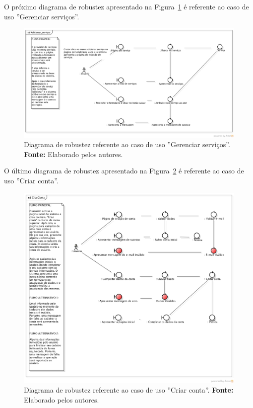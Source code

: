 O próximo diagrama de robustez apresentado na Figura~\ref{fig:ap1:diagrama_robustez_gerenciar_servicos} é referente ao caso de uso ''Gerenciar serviços''.

\captionsetup[figure]{list=no}
\begin{figure}[h!]
	\centerline{\includegraphics[scale=0.4]{./imagens/apendices/diagrama-robustez-adicionar-servicos.png}}
	\caption[Diagrama de robustez referente ao caso de uso ''Gerenciar serviços''.]
	{Diagrama de robustez referente ao caso de uso ''Gerenciar serviços''. \textbf{Fonte:} Elaborado pelos autores.}
	\label{fig:ap1:diagrama_robustez_gerenciar_servicos}
\end{figure}

O último diagrama de robustez apresentado na Figura~\ref{fig:ap1:diagrama_robustez_criar_conta} é referente ao caso de uso ''Criar conta''.

\newpage
\captionsetup[figure]{list=no}
\begin{figure}[h!]
	\centerline{\includegraphics[scale=0.4]{./imagens/apendices/diagrama-robustez-criar-conta.png}}
	\caption[Diagrama de robustez referente ao caso de uso ''Criar conta''.]
	{Diagrama de robustez referente ao caso de uso ''Criar conta''. \textbf{Fonte:} Elaborado pelos autores.}
	\label{fig:ap1:diagrama_robustez_criar_conta}
\end{figure}

